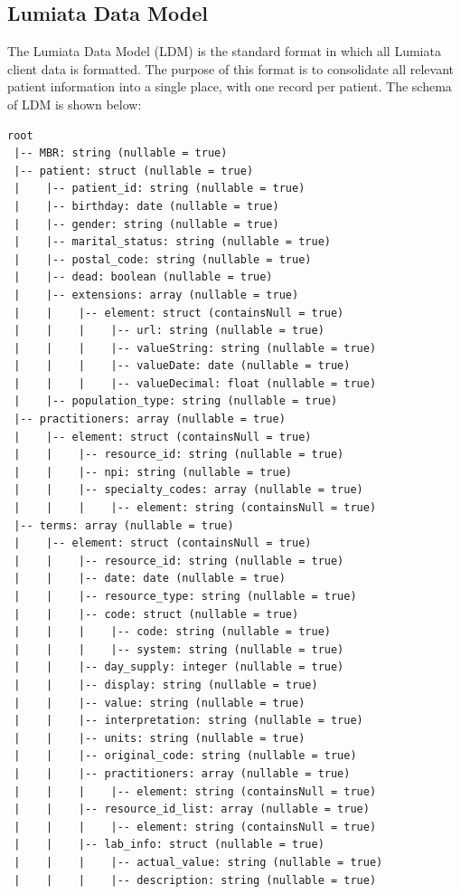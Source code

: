 \documentclass[letterpaper]{article} %
\begin{document}
\subsection{Lumiata Data Model}\label{sec:ldm}
The Lumiata Data Model (LDM) is the standard format in which all Lumiata client data is formatted.  The purpose of this format is to consolidate all relevant patient information into a single place, with one record per patient. The schema of LDM is shown below:
\begin{verbatim}
root
 |-- MBR: string (nullable = true)
 |-- patient: struct (nullable = true)
 |    |-- patient_id: string (nullable = true)
 |    |-- birthday: date (nullable = true)
 |    |-- gender: string (nullable = true)
 |    |-- marital_status: string (nullable = true)
 |    |-- postal_code: string (nullable = true)
 |    |-- dead: boolean (nullable = true)
 |    |-- extensions: array (nullable = true)
 |    |    |-- element: struct (containsNull = true)
 |    |    |    |-- url: string (nullable = true)
 |    |    |    |-- valueString: string (nullable = true)
 |    |    |    |-- valueDate: date (nullable = true)
 |    |    |    |-- valueDecimal: float (nullable = true)
 |    |-- population_type: string (nullable = true)
 |-- practitioners: array (nullable = true)
 |    |-- element: struct (containsNull = true)
 |    |    |-- resource_id: string (nullable = true)
 |    |    |-- npi: string (nullable = true)
 |    |    |-- specialty_codes: array (nullable = true)
 |    |    |    |-- element: string (containsNull = true)
 |-- terms: array (nullable = true)
 |    |-- element: struct (containsNull = true)
 |    |    |-- resource_id: string (nullable = true)
 |    |    |-- date: date (nullable = true)
 |    |    |-- resource_type: string (nullable = true)
 |    |    |-- code: struct (nullable = true)
 |    |    |    |-- code: string (nullable = true)
 |    |    |    |-- system: string (nullable = true)
 |    |    |-- day_supply: integer (nullable = true)
 |    |    |-- display: string (nullable = true)
 |    |    |-- value: string (nullable = true)
 |    |    |-- interpretation: string (nullable = true)
 |    |    |-- units: string (nullable = true)
 |    |    |-- original_code: string (nullable = true)
 |    |    |-- practitioners: array (nullable = true)
 |    |    |    |-- element: string (containsNull = true)
 |    |    |-- resource_id_list: array (nullable = true)
 |    |    |    |-- element: string (containsNull = true)
 |    |    |-- lab_info: struct (nullable = true)
 |    |    |    |-- actual_value: string (nullable = true)
 |    |    |    |-- description: string (nullable = true)

\end{verbatim}
\end{document}
